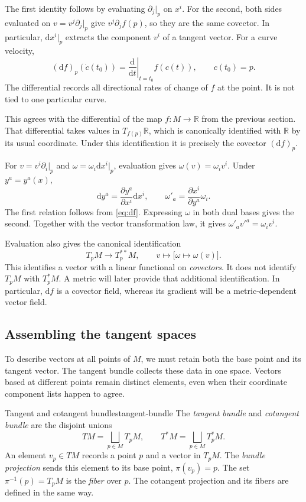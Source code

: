 \documentclass[11pt,a4paper]{article}
\numberwithin{equation}{section}
\newcommand{\R}{\mathbb R}
\newcommand{\dd}{\mathrm d}
\newcommand{\slideref}[1]{\par\nobreak\smallskip\nobreak{\footnotesize\color{ink!60}\textsc{Source slide #1}}\par\nobreak\smallskip\nobreak}
\begin{document}
The first identity follows by evaluating \(\partial_j|_p\) on \(x^i\).
For the second, both sides evaluated on \(v=v^j\partial_j|_p\) give
\(v^j\partial_j f(p)\), so they are the same covector. In particular,
\(\dd x^i|_p\) extracts the component \(v^i\) of a tangent vector.
For a curve velocity,
\[
 (\dd f)_p(\dot c(t_0))
 =\left.\frac{\dd}{\dd t}\right|_{t=t_0}f(c(t)),
 \qquad c(t_0)=p.
\]
The differential records all directional rates of change of \(f\) at the
point. It is not tied to one particular curve.

This agrees with the differential of the map \(f:M\to\R\) from the
previous section. That differential takes values in \(T_{f(p)}\R\),
which is canonically identified with \(\R\) by its usual coordinate.
Under this identification it is precisely the covector \((\dd f)_p\).

\slideref{11}
For \(v=v^i\partial_i|_p\) and \(\omega=\omega_i\dd x^i|_p\),
evaluation gives \(\omega(v)=\omega_i v^i\). Under \(y^a=y^a(x)\),
\begin{equation}
 \dd y^a=\frac{\partial y^a}{\partial x^i}\dd x^i,
 \qquad
 \omega'_a=\frac{\partial x^i}{\partial y^a}\omega_i.
 \label{eq:covector-coordinate-change}
\end{equation}
The first relation follows from \eqref{eq:df}. Expressing \(\omega\) in
both dual bases gives the second. Together with the vector transformation
law, it gives \(\omega'_a v'^a=\omega_i v^i\).

Evaluation also gives the canonical identification
\[
 T_pM\longrightarrow T_p^{**}M,
 \qquad v\longmapsto\bigl[\omega\longmapsto\omega(v)\bigr].
\]
This identifies a vector with a linear functional on \emph{covectors}.
It does not identify \(T_pM\) with \(T_p^*M\). A metric will later
provide that additional identification. In particular, \(\dd f\) is a
covector field, whereas its gradient will be a metric-dependent vector
field.

\subsection{Assembling the tangent spaces}

To describe vectors at all points of \(M\), we must retain both the base
point and its tangent vector. The tangent bundle collects these data in
one space. Vectors based at different points remain distinct elements,
even when their coordinate component lists happen to agree.


\begin{definition}{Tangent and cotangent bundles}{tangent-bundle}
The \emph{tangent bundle} and \emph{cotangent bundle} are the disjoint
unions
\[
 TM=\bigsqcup_{p\in M}T_pM,
 \qquad T^*M=\bigsqcup_{p\in M}T_p^*M.
\]
An element \(v_p\in TM\) records a point \(p\) and a vector in \(T_pM\).
The \emph{bundle projection} sends this element to its base point,
\(\pi(v_p)=p\). The set \(\pi^{-1}(p)=T_pM\) is the \emph{fiber}
over \(p\). The cotangent projection and its fibers are defined in the
same way.
\end{definition}
\end{document}
